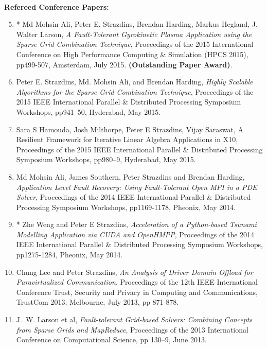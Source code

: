\documentclass[a4paper,oneside,12pt]{article}
\begin{document}
~\\
\textbf{Refereed Conference Papers:}
\begin{enumerate}
\setcounter{enumi}{4}
\item * Md Mohsin Ali, Peter E. Strazdins, Brendan Harding, Markus Hegland,
J. Walter Larson, {\em A Fault-Tolerant Gyrokinetic Plasma Application          
using the Sparse Grid Combination Technique}, Proceedings of the 2015
International Conference on High Performance Computing \& Simulation
(HPCS 2015), pp499-507, Amsterdam, July 2015.
{\bf (Outstanding Paper Award)}.

\item

Peter E. Strazdins, Md. Mohsin Ali, and Brendan Harding, {\em Highly            
Scalable Algorithms for the Sparse Grid Combination Technique},
Proceedings of the 2015 IEEE International Parallel \& Distributed
Processing Symposium Workshops, pp941--50, Hyderabad, May 2015.

\item

Sara S Hamouda, Josh Milthorpe, Peter E Strazdins, Vijay Saraswat, A
Resilient Framework for Iterative Linear Algebra Applications in X10,
Proceedings of the 2015 IEEE International Parallel \& Distributed
Processing Symposium Workshops, pp980--9, Hyderabad, May 2015.

\item
Md Mohsin Ali, James Southern, Peter Strazdins and Brendan Harding,
{\em Application Level Fault Recovery: Using Fault-Tolerant Open MPI            
  in a PDE Solver}, Proceedings of the 2014 IEEE International
Parallel \& Distributed Processing Symposium Workshops, pp1169-1178,
Pheonix, May 2014.

\item * Zhe Weng and Peter E Strazdins, {\em Acceleration of a
  Python-based Tsunami Modelling Application via CUDA and OpenHMPP},
  Proceedings of the 2014 IEEE International Parallel \& Distributed
  Processing Symposium Workshops, pp1275-1284, Pheonix, May 2014.

\item Chung Lee and Peter Strazdins,
  {\em An Analysis of Driver Domain Offload for Paravirtualized                 
    Communication},
Proceedings of the 12th IEEE International Conference
Trust, Security and Privacy in Computing and Communications,
TrustCom 2013; Melbourne, July 2013, pp 871-878.

\item
J.~W. Larson et al,
{\em Fault-tolerant Grid-based Solvers: Combining Concepts from                 
    Sparse Grids and MapReduce},
Proceedings of the 2013 International Conference on Computational Science,
pp 130--9, June 2013. 


\end{enumerate}
\end{document}

